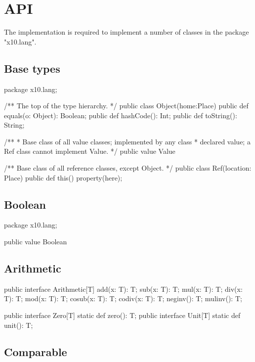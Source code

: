 \chapter{API}\label{XtenAPI}

The \Xten{} implementation is required to implement a number of
classes in the package \xcd"x10.lang".

\section{Base types}

\begin{xten}
package x10.lang;

/** The top of the type hierarchy. */
public class Object(home:Place) {
    public def equals(o: Object): Boolean;
    public def hashCode(): Int;
    public def toString(): String;
}

/**
 * Base class of all value classes; implemented by any class
 * declared value; a Ref class cannot implement Value.
 */
public value Value { }

/** Base class of all reference classes, except Object. */
public class Ref(location: Place) {
    public def this() { property(here); }
}
\end{xten}

\section{Boolean}

\begin{xten}
package x10.lang;

public value Boolean { }
\end{xten}

\section{Arithmetic}

\begin{xten}
public interface Arithmetic[T] {
    add(x: T): T;
    sub(x: T): T;
    mul(x: T): T;
    div(x: T): T;
    mod(x: T): T;
    cosub(x: T): T;
    codiv(x: T): T;
    neginv(): T;
    mulinv(): T;
}

public interface Zero[T] { static def zero(): T; }
public interface Unit[T] { static def unit(): T; }
\end{xten}


\section{Comparable}

